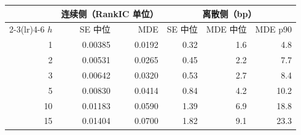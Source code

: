 \setlength{\tabcolsep}{5pt}
\begin{tabular}{rrrrrr}
\toprule
& \multicolumn{2}{c}{连续侧（RankIC 单位）} & \multicolumn{3}{c}{离散侧（bp）} \\
\cmidrule(lr){2-3}\cmidrule(lr){4-6}
$h$ & SE 中位 & MDE & SE 中位 & MDE 中位 & MDE p90 \\
\midrule
1 & 0.00385 & 0.0192 & 0.32 & 1.6 & 4.8 \\
2 & 0.00531 & 0.0265 & 0.45 & 2.2 & 7.7 \\
3 & 0.00642 & 0.0320 & 0.53 & 2.7 & 8.4 \\
5 & 0.00830 & 0.0414 & 0.84 & 4.2 & 10.2 \\
10 & 0.01183 & 0.0590 & 1.39 & 6.9 & 18.8 \\
15 & 0.01404 & 0.0700 & 1.82 & 9.1 & 23.3 \\
\bottomrule
\end{tabular}
